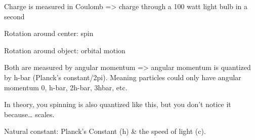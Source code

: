 \documentclass[letterpaper]{article}
\begin{document}
Charge is measured in Coulomb => charge through a 100 watt light bulb in
a second

Rotation around center: spin

Rotation around object: orbital motion

Both are measured by angular momentum => angular momentum is quantized
by h-bar (Planck's constant/2pi). Meaning particles could only have
angular momentum 0, h-bar, 2h-bar, 3hbar, etc.

In theory, you spinning is also quantized like this, but you don't
notice it because\ldots{} scales.

Natural constant: Planck's Constant (h) \& the speed of light (c).
\end{document}
